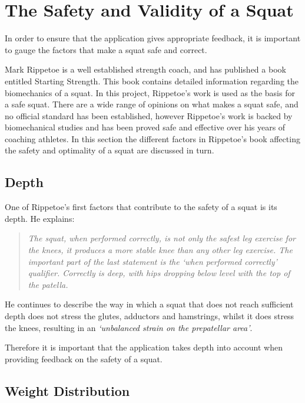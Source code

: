 \section{The Safety and Validity of a Squat}

In order to ensure that the application gives appropriate feedback, it is important to gauge the factors that make a squat safe and correct.

Mark Rippetoe is a well established strength coach, and has published a book entitled Starting Strength\cite{startingstrength}. This book contains detailed information regarding the biomechanics of a squat. In this project, Rippetoe's work is used as the basis for a safe squat. There are a wide range of opinions on what makes a squat safe, and no official standard has been established, however Rippetoe's work is backed by biomechanical studies and has been proved safe and effective over his years of coaching athletes. In this section the different factors in Rippetoe's book affecting the safety and optimality of a squat are discussed in turn.

\subsection{Depth}

One of Rippetoe's first factors that contribute to the safety of a squat is its depth. He explains:

\begin{quote}
\emph{The squat, when performed correctly, is not only the safest leg exercise for the knees, it produces a more stable knee than any other leg exercise. The important part of the last statement is the `when performed correctly' qualifier. Correctly is deep, with hips dropping below level with the 
top of the patella.}
\end{quote}

He continues to describe the way in which a squat that does not reach sufficient depth does not stress the glutes, adductors and hamstrings, whilst it does stress the knees, resulting in an \emph{`unbalanced strain on the prepatellar area'}.

Therefore it is important that the application takes depth into account when providing feedback on the safety of a squat.

\subsection{Weight Distribution}

